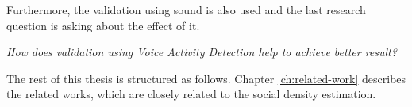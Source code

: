 Furthermore, the validation using sound is also used and the last research question is asking about the effect of it.
\begin{displayquote}\textit{
How does validation using Voice Activity Detection help to achieve better result?}
\end{displayquote}

The rest of this thesis is structured as follows. Chapter \ref{ch:related-work} describes the related works, which are closely related to the social density estimation.






